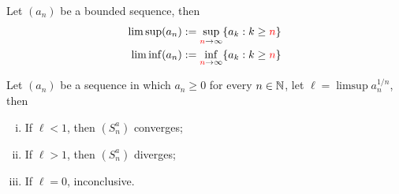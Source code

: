 \documentclass[11pt]{article}
\begin{document}
	\begin{definition}
		Let $(a_n)$ be a bounded sequence, then
		\begin{align}
			\limsup (a_n) &:= \sup_{\textcolor{red}{n} \to \infty} \{a_k : k \geq \textcolor{red}{n}\} \\
			\liminf (a_n) &:= \inf_{\textcolor{red}{n} \to \infty} \{a_k : k \geq \textcolor{red}{n}\} \\
		\end{align}
	\end{definition}
	
	\begin{theorem}
		Let $(a_n)$ be a sequence in which $a_n \geq 0$ for every $n \in \mathbb{N}$, let $\ell = \limsup a_n^{1/n}$, then
		\begin{enumerate}[(i)]
			\item If $\ell < 1$, then $(S^a_n)$ converges;
			\item If $\ell > 1$, then $(S^a_n)$ diverges;
			\item If $\ell = 0$, inconclusive.
		\end{enumerate}
	\end{theorem}
	
\end{document}
